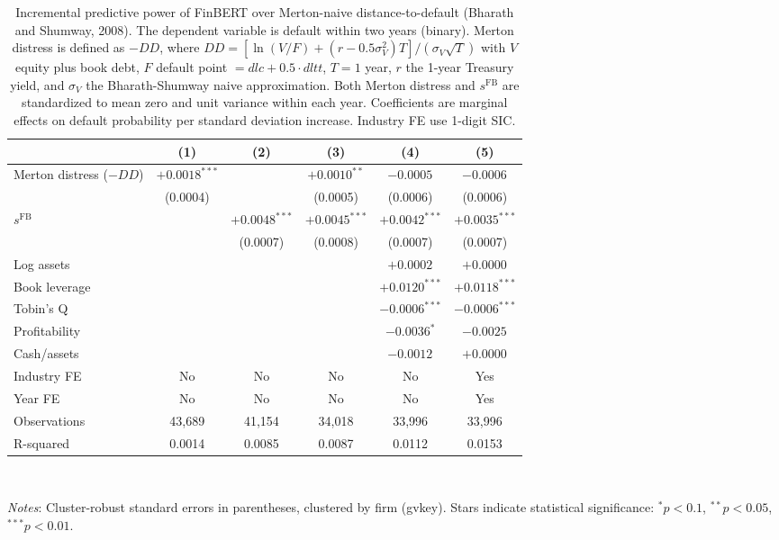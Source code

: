 \begin{table}[htbp]
\centering
\caption{Incremental predictive power of FinBERT over Merton-naive distance-to-default (Bharath and Shumway, 2008). The dependent variable is default within two years (binary). Merton distress is defined as $-DD$, where $DD = [\ln(V/F) + (r-0.5\sigma_V^2)T]/(\sigma_V \sqrt{T})$ with $V$ equity plus book debt, $F$ default point $=dlc + 0.5 \cdot dltt$, $T=1$ year, $r$ the 1-year Treasury yield, and $\sigma_V$ the Bharath-Shumway naive approximation. Both Merton distress and $s^{\mathrm{FB}}$ are standardized to mean zero and unit variance within each year. Coefficients are marginal effects on default probability per standard deviation increase. Industry FE use 1-digit SIC.}
\label{tab:t7_merton}
\small
\begin{tabular}{lccccc}
\toprule
 & (1) & (2) & (3) & (4) & (5) \\
\midrule
Merton distress ($-DD$) & $+0.0018^{***}$ &  & $+0.0010^{**}$ & $-0.0005^{}$ & $-0.0006^{}$ \\
 & (0.0004) &  & (0.0005) & (0.0006) & (0.0006) \\
$s^{\mathrm{FB}}$ &  & $+0.0048^{***}$ & $+0.0045^{***}$ & $+0.0042^{***}$ & $+0.0035^{***}$ \\
 &  & (0.0007) & (0.0008) & (0.0007) & (0.0007) \\
\midrule
Log assets &  &  &  & $+0.0002^{}$ & $+0.0000^{}$ \\
Book leverage &  &  &  & $+0.0120^{***}$ & $+0.0118^{***}$ \\
Tobin's Q &  &  &  & $-0.0006^{***}$ & $-0.0006^{***}$ \\
Profitability &  &  &  & $-0.0036^{*}$ & $-0.0025^{}$ \\
Cash/assets &  &  &  & $-0.0012^{}$ & $+0.0000^{}$ \\
\midrule
Industry FE & No & No & No & No & Yes \\
Year FE & No & No & No & No & Yes \\
\midrule
Observations & 43,689 & 41,154 & 34,018 & 33,996 & 33,996 \\
R-squared & 0.0014 & 0.0085 & 0.0087 & 0.0112 & 0.0153 \\
\bottomrule
\end{tabular}
\\[-2ex]
\begin{flushleft}
\footnotesize
\textit{Notes}: Cluster-robust standard errors in parentheses, clustered by firm (gvkey). Stars indicate statistical significance: $^{*}p<0.1$, $^{**}p<0.05$, $^{***}p<0.01$.
\end{flushleft}
\end{table}
